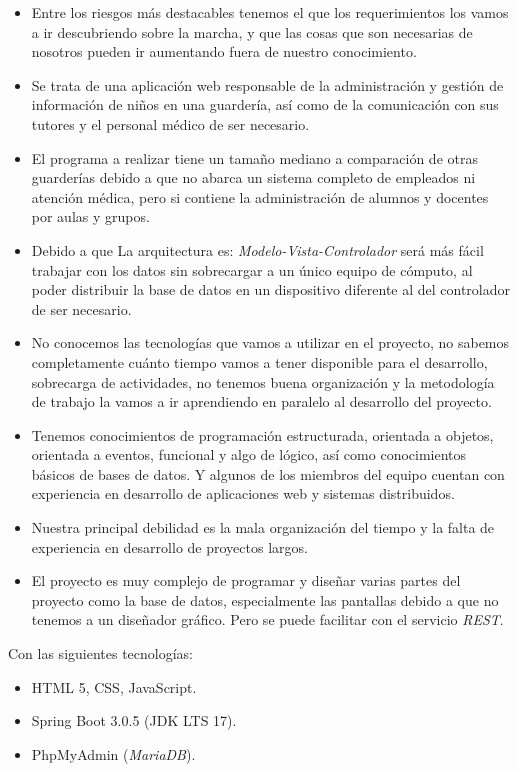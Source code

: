 \documentclass{article}
\begin{document}
\begin{itemize}
	\item Entre los riesgos más destacables tenemos el que los requerimientos los vamos a ir descubriendo sobre la marcha, y que las cosas que son necesarias de nosotros pueden ir aumentando fuera de nuestro conocimiento.
	\item Se trata de una aplicación web responsable de la administración y gestión de información de niños en una guardería, así como de la comunicación con sus tutores y el personal médico de ser necesario.
	\item El programa a realizar tiene un tamaño mediano a comparación de otras guarderías debido a que no abarca un sistema completo de empleados ni atención médica, pero si contiene la administración de alumnos y docentes por aulas y grupos.
	\item Debido a que La arquitectura es: \emph{Modelo-Vista-Controlador} será más fácil trabajar con los datos sin sobrecargar a un único equipo de cómputo, al poder distribuir la base de datos en un dispositivo diferente al del controlador de ser necesario.
	\item No conocemos las tecnologías que vamos a utilizar en el proyecto, no sabemos completamente cuánto tiempo vamos a tener disponible para el desarrollo, sobrecarga de actividades, no tenemos buena organización y la metodología de trabajo la vamos a ir aprendiendo en paralelo al desarrollo del proyecto.

	\item Tenemos conocimientos de programación estructurada, orientada a objetos, orientada a eventos, funcional y algo de lógico, así como conocimientos básicos de bases de datos. Y algunos de los miembros del equipo cuentan con experiencia en desarrollo de aplicaciones web y sistemas distribuidos.

	\item Nuestra principal debilidad es la mala organización del tiempo y la falta de experiencia en desarrollo de proyectos largos.

	\item El proyecto es muy complejo de programar y diseñar varias partes del proyecto como la base de datos, especialmente las pantallas debido a que no tenemos a un diseñador gráfico. Pero se puede facilitar con el servicio \emph{REST}.

\end{itemize}

Con las siguientes tecnologías:
\begin{itemize}
	\item HTML 5, CSS, JavaScript.
	\item Spring Boot 3.0.5 (JDK LTS 17).
	\item PhpMyAdmin (\emph{MariaDB}).
\end{itemize}
\end{document}
